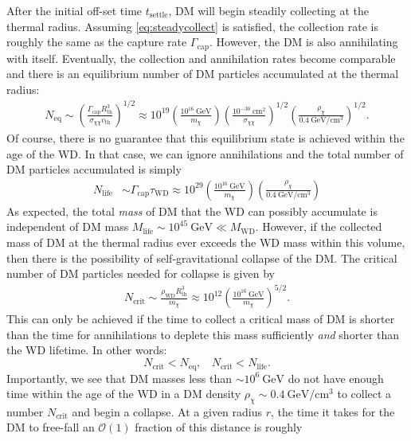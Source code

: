 \documentclass[preprintnumbers,amsmath,amssymb,prd,superscriptaddress]{revtex4}
\newcommand{\OO}{\mathcal{O}}
\newcommand{\GeV}{\text{GeV}}
\newcommand{\cm}{\text{cm}}
\def\r{\right)}
\def\l{\left(}
\begin{document}
After the initial off-set time $t_\text{settle}$, DM will begin steadily collecting at the thermal radius.
Assuming \eqref{eq:steadycollect} is satisfied, the collection rate is roughly the same as the capture rate $\Gamma_\text{cap}$. 
However, the DM is also annihilating with itself.
Eventually, the collection and annihilation rates become comparable and there is an equilibrium number of DM particles accumulated at the thermal radius:
\begin{align}
N_\text{eq} \sim \l \frac{\Gamma_\text{cap} R_\text{th}^3}{\sigma_{\chi \chi} v_\text{th}} \r^{1/2} \approx 10^{19} \l \frac{10^{16} ~\GeV}{m_\chi} \r \l \frac{10^{-30} ~\cm^2}{\sigma_{\chi \chi}} \r^{1/2} \l \frac{\rho_\chi}{0.4 ~\GeV/\cm^3} \r^{1/2}.
\end{align}
Of course, there is no guarantee that this equilibrium state is achieved within the age of the WD. 
In that case, we can ignore annihilations and the total number of DM particles accumulated is simply
\begin{align}
N_\text{life} &\sim \Gamma_\text{cap} \tau_\text{WD} \approx 10^{29}  \l \frac{10^{16} ~\GeV}{m_\chi} \r \l \frac{\rho_\chi}{0.4 ~\GeV/\cm^3} \r
\end{align}
As expected, the total \emph{mass} of DM that the WD can possibly accumulate is independent of DM mass $M_\text{life} \sim 10^{45} ~\GeV \ll M_\text{WD}$. 
However, if the collected mass of DM at the thermal radius ever exceeds the WD mass within this volume, then there is the possibility of self-gravitational collapse of the DM.
The critical number of DM particles needed for collapse is given by
\begin{align}
\label{eq:Ncore}
    N_\text{crit} \sim \frac{\rho_\text{WD} R^3_\text{th}}{m_\chi} \approx 10^{12} \l \frac{10^{16} ~\GeV}{m_\chi} \r^{5/2}. \nonumber
\end{align}
This can only be achieved if the time to collect a critical mass of DM is shorter than the time for annihilations to deplete this mass sufficiently \emph{and} shorter than the WD lifetime. 
In other words:
\begin{equation}
\label{eq:collapsecondition}
N_\text{crit} < N_\text{eq}, ~~~~ N_\text{crit} < N_\text{life}.
\end{equation}
Importantly, we see that DM masses less than $\sim 10^{6} ~\GeV$ do not have enough time within the age of the WD in a DM density $\rho_\chi \sim 0.4 ~\GeV/\cm^3$ to collect a number $N_\text{crit}$ and begin a collapse. 
At a given radius $r$, the time it takes for the DM to free-fall an $\OO(1)$ fraction of this distance is roughly
\end{document}
